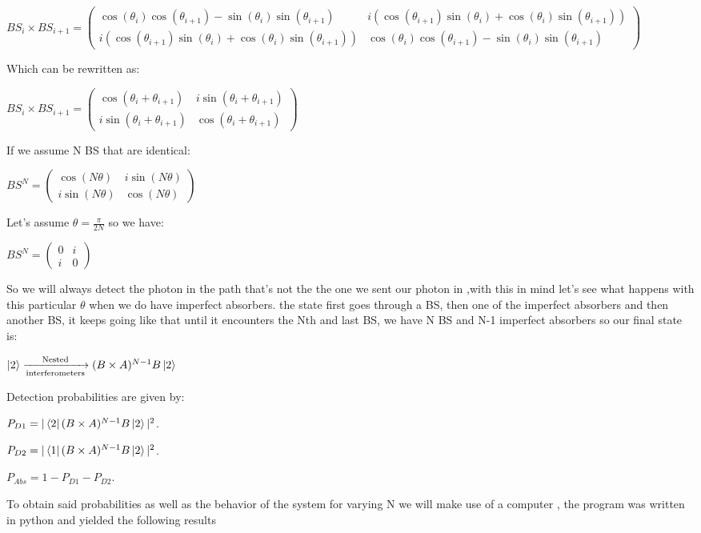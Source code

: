 \documentclass[11pt]{article}
\begin{document}
$BS_{i} \times BS_{i+1}=\begin{pmatrix} \cos(\theta_{i})\cos(\theta_{i+1})-\sin(\theta_{i})\sin(\theta_{i+1}) & i (\cos(\theta_{i+1})\sin(\theta_{i})+\cos(\theta_{i})\sin(\theta_{i+1})) \\ i (\cos(\theta_{i+1})\sin(\theta_{i})+\cos(\theta_{i})\sin(\theta_{i+1}))& \cos(\theta_{i})\cos(\theta_{i+1})-\sin(\theta_{i})\sin(\theta_{i+1}) \end{pmatrix}$

Which can be rewritten as:

$BS_{i} \times BS_{i+1}=\begin{pmatrix} \cos(\theta_{i}+\theta_{i+1}) & i \sin(\theta_{i}+\theta_{i+1}) \\ i \sin(\theta_{i}+\theta_{i+1}) & \cos(\theta_{i}+\theta_{i+1}) \end{pmatrix} $

If we assume N BS that are identical:

$BS^{N}=\begin{pmatrix} \cos(N\theta) & i \sin(N\theta) \\ i \sin(N\theta) & \cos(N\theta) \end{pmatrix}$

Let's assume $\theta=\frac{\pi}{2N}$ so we have:

$BS^{N}=\begin{pmatrix} 0 & i  \\ i  & 0 \end{pmatrix}$

So we will always detect the photon in the path that's not the the one we sent our photon in ,with this in mind let's see what happens with this particular $\theta$ when we do have imperfect absorbers. the state first goes through a BS, then one of the imperfect absorbers and then another BS, it keeps going like that until it encounters the Nth and last BS, we have N BS and N-1 imperfect absorbers so our final state is:


$\ket{2}\xrightarrow[\text{interferometers}]{\text{Nested}}(B \times A)^{N-1}B \ket{2}$

Detection probabilities are given by:


 
 
$P_{D1}=|\bra{2} (B \times A)^{N-1}B \ket{2}|^2$.

$P_{D2}=|\bra{1} (B \times A)^{N-1}B \ket{2}|^2$.

$P_{Abs}=1-P_{D1}-P_{D2}$.
 
 
To obtain said probabilities as well as the behavior of the system for varying N we will make use of a computer , the program was written in python and yielded the following results
\end{document}

